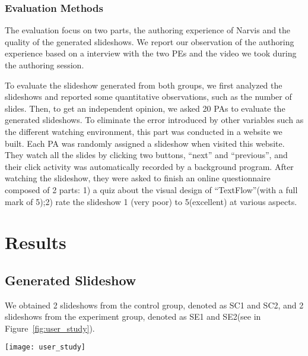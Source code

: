 \subsubsection{Evaluation Methods}
The evaluation focus on two parts, the authoring experience of Narvis and the quality of the generated slideshows. We report our observation of the authoring experience based on a interview with the two PEs and the video we took during the authoring session. 

To evaluate the slideshow generated from both groups, we first analyzed the slideshows and reported some quantitative observations, such as the number of slides.
Then, to get an independent opinion, we asked 20 PAs to evaluate the generated slideshows. To eliminate the error introduced by other variables such as the different watching environment, this part was conducted in a website we built. Each PA was randomly assigned a slideshow when visited this website. They watch all the slides by clicking two buttons, ``next'' and ``previous'', and their click activity was automatically recorded by a background program.  After watching the slideshow, they were asked to finish an online questionnaire composed of 2 parts: 1) a quiz about the visual design of ``TextFlow''(with a full mark of 5);2) rate the slideshow  1 (very poor) to 5(excellent) at various aspects. 

\section{Results}

\subsection{Generated Slideshow}
We obtained 2 slideshows from the control group, denoted as SC1 and SC2, and 2 slideshows from the experiment group, denoted as SE1 and SE2(see in Figure~\ref{fig:user_study}). 


\begin{figure*}
 \centering %
 \texttt{[image: user\_study]}
 \caption{The slideshows produced by (a)Narvis and (b),(c)Power Point to introduce a visual unit, thread, in \textit{TextFlow}\cite{cui_textflow:_2011}. Note that (b) and (c) both miss the visual grammar of thread color and (c) forgets to mention the visual grammar of wave bundling length. }
 \label{fig:user_study}
\end{figure*}

